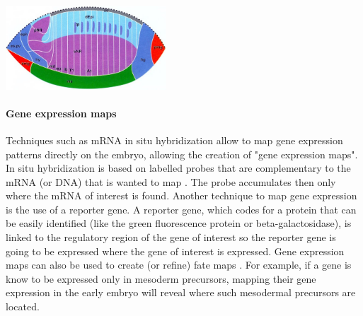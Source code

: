 \begin{mdframed}[style=boxstyle,frametitle={Box1. Fate maps and gene expression maps }]
\par
{\centering
  \includegraphics[width=0.45\textwidth]{./Images/blastoderm_fatemap_small.jpg}
  \centering
\label{fig:blastoderm_fatemap}
}
\par

\paragraph{Gene expression maps}

Techniques such as mRNA in situ hybridization allow to map gene expression patterns directly on the embryo, allowing the creation of "gene expression maps". In situ hybridization is based on labelled probes that are complementary to the mRNA (or DNA) that is wanted to map \citep{Gall1969}. The probe accumulates then only where the mRNA of interest is found.
Another technique to map gene expression is the use of a reporter gene. A reporter gene, which codes for a protein that can be easily identified (like the green fluorescence protein or beta-galactosidase), is linked to the regulatory region of the gene of interest so the reporter gene is going to be expressed where the gene of interest is expressed.
Gene expression maps can also be used to create (or refine) fate maps \citep{gilbert2007fatemap}. 
For example, if a gene is know to be expressed only in mesoderm precursors, mapping their gene expression in the early embryo will reveal where such mesodermal precursors are located.


\end{mdframed}
